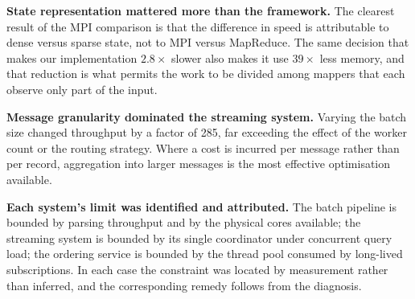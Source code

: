 \documentclass[11pt,a4paper]{article}
\begin{document}
\textbf{State representation mattered more than the framework.} The clearest result of
the MPI comparison is that the difference in speed is attributable to dense versus sparse
state, not to MPI versus MapReduce. The same decision that makes our implementation
$2.8\times$ slower also makes it use $39\times$ less memory, and that reduction is what
permits the work to be divided among mappers that each observe only part of the input.

\textbf{Message granularity dominated the streaming system.} Varying the batch size
changed throughput by a factor of 285, far exceeding the effect of the worker
count or the routing strategy. Where a cost is incurred per message rather than per
record, aggregation into larger messages is the most effective optimisation available.

\textbf{Each system's limit was identified and attributed.} The batch pipeline is
bounded by parsing throughput and by the physical cores available; the streaming system
is bounded by its single coordinator under concurrent query load; the ordering service
is bounded by the thread pool consumed by long-lived subscriptions. In each case the
constraint was located by measurement rather than inferred, and the corresponding remedy
follows from the diagnosis.
\end{document}
